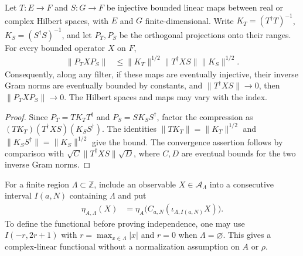 \begin{lemma}
    \label{thm:parent_cross_range_compression}
    \leanok
    Let $T\colon E\to F$ and $S\colon G\to F$ be injective bounded linear
    maps between real or complex Hilbert spaces, with $E$ and $G$
    finite-dimensional. Write $K_T=(T^\dagger T)^{-1}$,
    $K_S=(S^\dagger S)^{-1}$, and let $P_T,P_S$ be the orthogonal
    projections onto their ranges. For every bounded operator $X$ on $F$,
    \begin{align}
        \lVert P_T X P_S\rVert
         & \leq\lVert K_T\rVert^{1/2}
        \lVert T^\dagger X S\rVert\lVert K_S\rVert^{1/2}.
    \end{align}
    Consequently, along any filter, if these maps are eventually injective,
    their inverse Gram norms are eventually bounded by constants, and
    $\lVert T^\dagger X S\rVert\to0$, then
    $\lVert P_T X P_S\rVert\to0$. The Hilbert spaces and maps may vary
    with the index.
\end{lemma}

\begin{proof}
    \leanok
    Since $P_T=TK_TT^\dagger$ and $P_S=SK_SS^\dagger$,
    factor the compression as
    $(TK_T)(T^\dagger X S)(K_SS^\dagger)$.
    The identities $\lVert TK_T\rVert=\lVert K_T\rVert^{1/2}$ and
    $\lVert K_SS^\dagger\rVert=\lVert K_S\rVert^{1/2}$ give the bound.
    The convergence assertion follows by comparison with
    $\sqrt C\lVert T^\dagger X S\rVert\sqrt D$, where $C,D$ are
    eventual bounds for the two inverse Gram norms.
\end{proof}

\begin{definition}
    \label{def:mps_finite_region_expectation}
    \leanok
    For a finite region $\Lambda\subset\mathbb Z$, include an observable
    $X\in\mathcal A_\Lambda$ into a consecutive interval $I(a,N)$
    containing $\Lambda$ and put
    \begin{align}
        \eta_{A,\Lambda}(X)
         & =\eta_A\bigl(C_{a,N}(\iota_{\Lambda,I(a,N)}X)\bigr).
    \end{align}
    To define the functional before proving independence, one may use
    $I(-r,2r+1)$ with $r=\max_{x\in\Lambda}|x|$ and $r=0$ when
    $\Lambda=\varnothing$. This gives a complex-linear functional without
    a normalization assumption on $A$ or $\rho$.
\end{definition}

